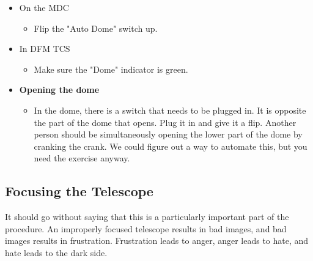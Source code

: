 \documentclass[letterpaper, 12pt]{report}
\begin{document}
\begin{itemize}
\begin{itemize}
\begin{itemize}
\begin{itemize}
						\end{itemize}
					\end{itemize}
					\begin{itemize}
						\item On the MDC
						\begin{itemize}
							\item Flip the "Auto Dome" switch up.
						\end{itemize}
					\end{itemize}
					\begin{itemize}
						\item In DFM TCS
						\begin{itemize}
							\item Make sure the "Dome" indicator is green.
						\end{itemize}
					\end{itemize}
				\end{itemize}
	\end{itemize} 
\begin{itemize}
	\item \large \textbf{Opening the dome}
	\begin{itemize}
		\item In the dome, there is a switch that needs to be plugged in. It is opposite the part of the dome that opens. Plug it in and give it a flip. Another person should be simultaneously opening the lower part of the dome by cranking the crank. We could figure out a way to automate this, but you need the exercise anyway.
	\end{itemize}
\end{itemize}
\subsection{Focusing the Telescope}
It should go without saying that this is a particularly important part of the procedure. An improperly focused telescope results in bad images, and bad images results in frustration. Frustration leads to anger, anger leads to hate, and hate leads to the dark side.
\end{document}
